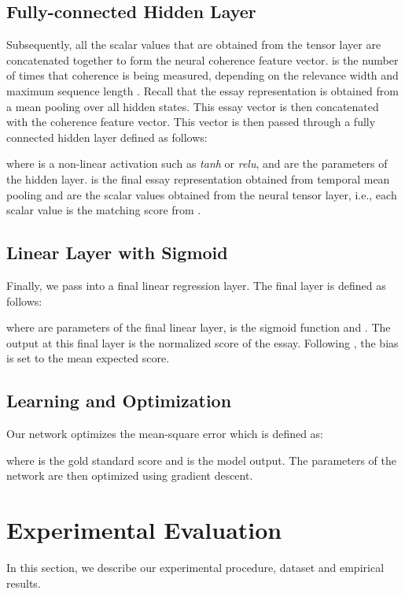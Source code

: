\documentclass[letterpaper]{article}
\begin{document}
\subsection{Fully-connected Hidden Layer}
Subsequently, all the scalar values  that are obtained from the tensor layer are concatenated together to form the neural coherence feature vector.  is the number of times that coherence is being measured, depending on the relevance width  and maximum sequence length . Recall that the essay representation is obtained from a mean pooling over all hidden states. This essay vector is then concatenated with the coherence feature vector. This vector is then passed through a fully connected hidden layer defined as follows: 

where  is a non-linear activation such as \textit{tanh} or \textit{relu},  and  are the parameters of the hidden layer.  is the final essay representation obtained from temporal mean pooling and  are the scalar values obtained from the neural tensor layer, i.e., each scalar value is the matching score from  . 

\subsection{Linear Layer with Sigmoid}
Finally, we pass  into a final linear regression layer. The final layer is defined as follows:

where  are parameters of the final linear layer,  is the sigmoid function and . The output at this final layer is the normalized score of the essay. Following \cite{DBLP:conf/emnlp/TaghipourN16}, the bias is set to the mean expected score. 
 
\subsection{Learning and Optimization}
Our network optimizes the mean-square error which is defined as:



\noindent where  is the gold standard score and  is the model output. The parameters of the network are then optimized using gradient descent.

\section{Experimental Evaluation}
In this section, we describe our experimental procedure, dataset and empirical results. 
\end{document}
